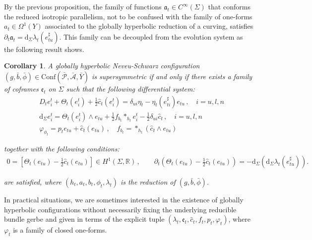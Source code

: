 \documentclass[10pt,reqno,a4paper]{amsart}
\theoremstyle{plain}
\newtheorem{cor}[thm]{Corollary}
\theoremstyle{definition}
\theoremstyle{remark}
\theoremstyle{remark}
\def\dd{\mathrm{d}}
\def\Conf{\mathrm{Conf}}
\def\cA{\mathcal{A}}
\def\cP{\mathcal{P}}
\def\fra{\mathfrak{a}}
\def\fre{\mathfrak{e}}
\renewcommand{\(}{ (}
\renewcommand{\)}{ )}
\begin{document}
\noindent
By the previous proposition, the family of functions $\fra_t\in C^{\infty}(\Sigma)$ that conforms the reduced isotropic parallelism, not to be confused with the family of one-forms $a_t\in\Omega^1(Y)$ associated to the globally hyperbolic reduction of a curving, satisfies $\partial_t\fra_t=\dd_{\Sigma}\lambda_t(e^{\sharp}_{tu})$. This family can be decoupled from the evolution system as the following result shows.

\begin{cor}
\label{cor:susyevolcor}
A globally hyperbolic Neveu-Schwarz configuration $(g,\bar{b},\bar{\phi})\in \Conf(\bar{\cP},\bar{\cA},\bar{Y})$ is supersymmetric if and only if there exists a family of coframes $\fre_t$ on $\Sigma$ such that the following differential system:
\begin{eqnarray}
& D_t e^t_i+\Theta_t(e^t_i)+\frac{1}{2}\widehat{c}_t (e^t_i)=\delta_{ui}\eta_t-\eta_t(e^{\sharp}_{ti})e_{tu}\, , \quad i=u,l,n\nonumber \\
& \dd_{\Sigma}e^t_i=\Theta_t(e^t_i)\wedge e_{tu}+\frac{1}{2}f_{b_t}\ast_{h_t}e^t_i-\frac{1}{2}\delta_{ui}\widehat{c}_t \, , \quad i=u,l,n\label{eq:susyevolcor} \\
& \varphi_{\phi_t}=p_t e_{tu}+\widehat{c}_t (e_{tu})\, , \quad f_{b_t}=\ast_{h_t}(\widehat{c}_t \wedge e_{tu})\nonumber
\end{eqnarray}

\noindent
together with the following conditions:
\begin{eqnarray*}
0=[\Theta_t(e_{tu})-\frac{1}{2}\widehat{c}_t (e_{tu})]\in H^1(\Sigma,\mathbb R)\, , \qquad
\partial_t(\Theta_t(e_{tu})-\frac{1}{2}\widehat{c}_t (e_{tu}))=-\dd_{\Sigma}(\dd_{\Sigma}\lambda_t(e^{\sharp}_{tu})).
\end{eqnarray*}

\noindent
are satisfied, where $(h_t,a_t,b_t,\phi_t,\lambda_t)$ is the reduction of $(g,\bar b,\bar\phi)$.
\end{cor}

\noindent
In practical situations, we are sometimes interested in the existence of globally hyperbolic configurations without necessarily fixing the underlying reducible bundle gerbe and given in terms of the explicit tuple $(\lambda_t,\fre_t,\widehat{c}_t ,f_t,p_t,\varphi_{t})$, where $\varphi_{t}$ is a family of closed one-forms.
\end{document}
